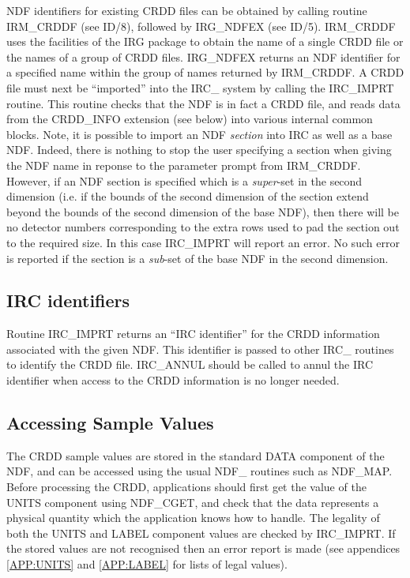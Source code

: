 NDF identifiers for existing CRDD files can be obtained by calling routine
IRM\_CRDDF (see ID/8), followed by IRG\_NDFEX (see ID/5). IRM\_CRDDF uses the
facilities of the IRG package to obtain the name of a single CRDD file or the
names of a group of CRDD files. IRG\_NDFEX returns an NDF identifier for a
specified name within the group of names returned by IRM\_CRDDF. A CRDD file
must next be ``imported'' into the IRC\_ system by calling the IRC\_IMPRT
routine. This routine checks that the NDF is in fact a CRDD file, and reads data
from the CRDD\_INFO extension (see below) into various internal common blocks.
Note, it is possible to import an NDF {\em section} into IRC as well as a base
NDF. Indeed, there is nothing to stop the user specifying a section when giving
the NDF name in reponse to the parameter prompt from IRM\_CRDDF. However, if
an NDF section is specified which is a {\em super}-set in the second dimension
(i.e. if the bounds of the second dimension of the section extend beyond the
bounds of the second dimension of the base NDF), then there will be no
detector numbers corresponding to the extra rows used to pad the section out to
the required size. In this case IRC\_IMPRT will report an error. No such error
is reported if the section is a {\em sub}-set of the base NDF in the second
dimension.

\subsection{IRC identifiers}
Routine IRC\_IMPRT returns an ``IRC identifier'' for the CRDD information
associated with the given NDF. This identifier is passed to other IRC\_ routines
to identify the CRDD file. IRC\_ANNUL should be called to annul the IRC
identifier when access to the CRDD information is no longer needed.

\subsection {Accessing Sample Values}
The CRDD sample values are stored in the standard DATA component of the NDF, and
can be accessed using the usual NDF\_ routines such as NDF\_MAP. Before
processing the CRDD, applications should first get the value of the UNITS
component using NDF\_CGET, and check that the data represents a physical
quantity which the application knows how to handle. The legality of both the
UNITS and LABEL component values are checked by IRC\_IMPRT. If the stored values
are not recognised then an error report is made (see appendices
\ref {APP:UNITS} and \ref {APP:LABEL} for lists of legal values).

